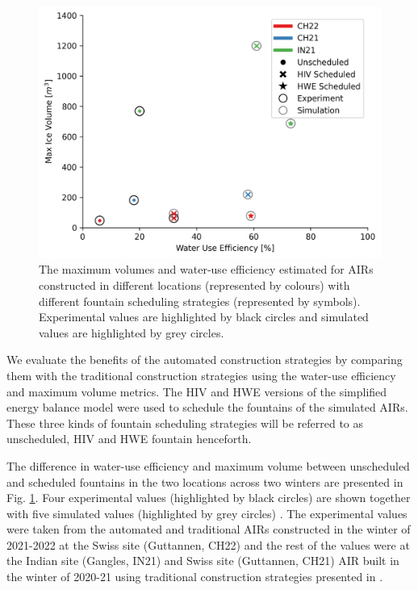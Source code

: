 \documentclass[tc, manuscript]{copernicus}
\begin{document}
\begin{figure}[t]
\includegraphics[width=12cm]{Figures/wue.png}

\caption{The maximum volumes and water-use efficiency estimated for AIRs constructed in different locations
(represented by colours) with different fountain scheduling strategies (represented by symbols). Experimental
values are highlighted by black circles and simulated values are highlighted by grey circles.  }

\label{fig:wue}
\end{figure}

We evaluate the benefits of the automated construction strategies by comparing them with the traditional
construction strategies using the water-use efficiency and maximum volume metrics. The HIV and HWE versions
of the simplified energy balance model were used to schedule the fountains of the simulated AIRs. These three
kinds of fountain scheduling strategies will be referred to as unscheduled, HIV and HWE fountain henceforth. 

The difference in water-use efficiency and maximum volume between unscheduled and scheduled fountains in the two
locations across two winters are presented in Fig. \ref{fig:wue}. Four experimental values (highlighted by black
circles) are shown together with five simulated values (highlighted by grey circles) .  The experimental values
were taken from the automated and traditional AIRs constructed in the winter of 2021-2022 at the Swiss site
(Guttannen, CH22) and the rest of the values were at the Indian site (Gangles, IN21) and Swiss site (Guttannen,
CH21) AIR built in the winter of 2020-21 using traditional construction strategies presented in
\cite{balasubramanianInfluenceMeteorologicalConditions2022}. 
\end{document}
